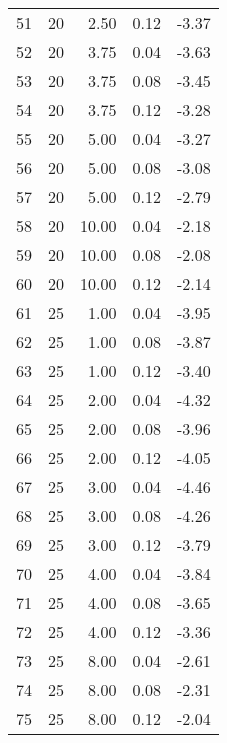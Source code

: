 \begin{tabular}{rrrrr}
    51 &        20 &   2.50 & 0.12 &                  -3.37 \\
    52 &        20 &   3.75 & 0.04 &                  -3.63 \\
    53 &        20 &   3.75 & 0.08 &                  -3.45 \\
    54 &        20 &   3.75 & 0.12 &                  -3.28 \\
    55 &        20 &   5.00 & 0.04 &                  -3.27 \\
    56 &        20 &   5.00 & 0.08 &                  -3.08 \\
    57 &        20 &   5.00 & 0.12 &                  -2.79 \\
    58 &        20 &  10.00 & 0.04 &                  -2.18 \\
    59 &        20 &  10.00 & 0.08 &                  -2.08 \\
    60 &        20 &  10.00 & 0.12 &                  -2.14 \\
    61 &        25 &   1.00 & 0.04 &                  -3.95 \\
    62 &        25 &   1.00 & 0.08 &                  -3.87 \\
    63 &        25 &   1.00 & 0.12 &                  -3.40 \\
    64 &        25 &   2.00 & 0.04 &                  -4.32 \\
    65 &        25 &   2.00 & 0.08 &                  -3.96 \\
    66 &        25 &   2.00 & 0.12 &                  -4.05 \\
    67 &        25 &   3.00 & 0.04 &                  -4.46 \\
    68 &        25 &   3.00 & 0.08 &                  -4.26 \\
    69 &        25 &   3.00 & 0.12 &                  -3.79 \\
    70 &        25 &   4.00 & 0.04 &                  -3.84 \\
    71 &        25 &   4.00 & 0.08 &                  -3.65 \\
    72 &        25 &   4.00 & 0.12 &                  -3.36 \\
    73 &        25 &   8.00 & 0.04 &                  -2.61 \\
    74 &        25 &   8.00 & 0.08 &                  -2.31 \\
    75 &        25 &   8.00 & 0.12 &                  -2.04 \\
\bottomrule
\end{tabular}
